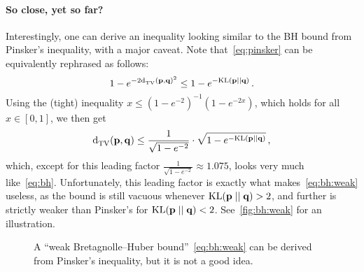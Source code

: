 \documentclass[10pt]{article}
\begin{document}
\paragraph{So close, yet so far?}
Interestingly, one can derive an inequality looking similar to the BH bound from Pinsker's inequality, with a major caveat. Note that~\eqref{eq:pinsker} can be equivalently rephrased as follows:
\begin{equation}
  1-e^{-2\totalvardist{\p}{\q}^2} \leq 1-e^{-\kldiv{\p}{\q}}\,.
\end{equation}
Using the (tight) inequality $x\leq (1-e^{-2})^{-1}(1-e^{-2x})$, which holds for all $x\in[0,1]$, we then get
\begin{equation}
  \label{eq:bh:weak}
  \totalvardist{\p}{\q} \leq \frac{1}{\sqrt{1-e^{-2}}}\cdot\sqrt{1-e^{-\kldiv{\p}{\q}}}\,,
\end{equation}
which, except for this leading factor $\frac{1}{\sqrt{1-e^{-2}}} \approx 1.075$, looks very much like~\eqref{eq:bh}. Unfortunately, this leading factor is exactly what makes~\eqref{eq:bh:weak} useless, as the bound is still vacuous whenever $\kldiv{\p}{\q}>2$, and further is strictly weaker than Pinsker's for $\kldiv{\p}{\q}<2$. See~\autoref{fig:bh:weak} for an illustration.

\begin{figure}[ht!]\centering
{} 
\caption{\label{fig:bh:weak}A ``weak Bretagnolle--Huber bound''~\eqref{eq:bh:weak} can be derived from Pinsker's inequality, but it is not a good idea.}
\end{figure}

\end{document}

